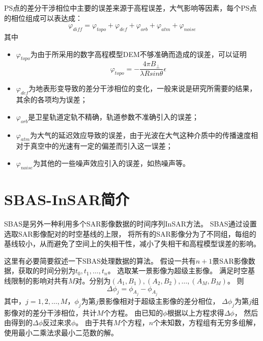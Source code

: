 PS点的差分干涉相位中主要的误差来源于高程误差，大气影响等因素，每个PS点的相位组成可以表达成：
\begin{equation}
    \varphi_{diff}=\varphi_{topo}+\varphi_{def}+\varphi_{orb}+\varphi_{atm}+\varphi_{noise}
\end{equation}
其中
\begin{itemize}
    \item $\varphi_{topo}$为由于所采用的数字高程模型DEM不够准确而造成的误差，可以证明
    \begin{equation}
        \varphi_{topo}=-\frac{4\pi B_{\bot}}{\lambda R sin \theta}\epsilon
    \end{equation}
    \item $\varphi_{def}$为地表形变导致的差分干涉相位的变化，一般来说是研究所需要的结果，其余的各项均为误差；
    \item $\varphi_{orb}$是卫星轨道定轨不精确，轨道参数不准确引入的误差；
    \item $\varphi_{atm}$为大气的延迟效应导致的误差，由于光波在大气这种介质中的传播速度相对于真空中的光速有一定的偏差而引入这一误差；
    \item $\varphi_{noise}$为其他的一些噪声效应引入的误差，如热噪声等。
\end{itemize}

\section{SBAS-InSAR简介}
SBAS是另外一种利用多个SAR影像数据的时间序列InSAR方法。
SBAS通过设置选取SAR影像配对的时空基线的上限，
将所有的SAR影像分为了不同组，每组的基线较小，从而避免了空间上的失相干性，减小了失相干和高程模型误差的影响。

这里有必要简要叙述一下SBAS处理数据的算法。
假设一共有$n+1$景SAR影像数据，获取的时间分别为$t_0,t_1,\ldots,t_n$。
选取某一景影像为超级主影像。
满足时空基线限制的影响对共有$M$对。分别为$(A_1,B_1),(A_2,B_2),\ldots,(A_M,B_M)$。
则
\begin{equation}
    \Delta\phi_j=\phi_{A_j}-\phi_{A_j}
\end{equation}
其中，$j=1,2,\ldots,M$，$\phi_j$为第$j$景影像相对于超级主影像的差分相位，
$\Delta\phi_j$为第$j$组影像对的差分干涉相位，共计$M$个方程。
由已知的$\phi$根据以上方程求得$\Delta\phi$，
然后由得到的$\Delta\phi$反过来求$\phi$。
由于共有$M$个方程，$n$个未知数，方程组有无穷多组解，使用最小二乘法求最小二范数的解。

